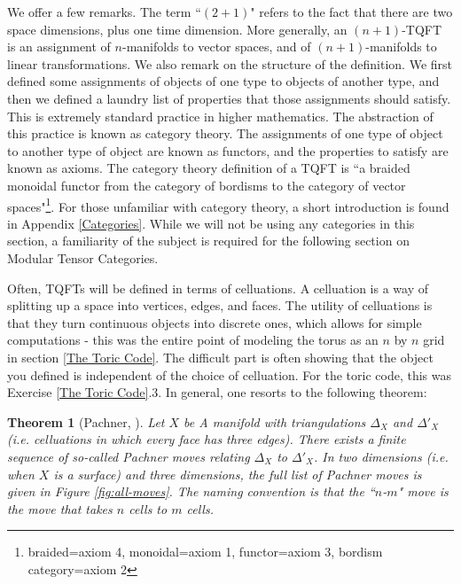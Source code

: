 \documentclass{article}
\newtheorem{theorem}{Theorem}[section]
\theoremstyle{definition}
\numberwithin{figure}{section}
\begin{document}
We offer a few remarks. The term ``$(2+1)$" refers to the fact that there are two space dimensions, plus one time dimension. More generally, an $(n+1)$-TQFT is an assignment of $n$-manifolds to vector spaces, and of $(n+1)$-manifolds to linear transformations. We also remark on the structure of the definition. We first defined some assignments of objects of one type to objects of another type, and then we defined a laundry list of properties that those assignments should satisfy. This is extremely standard practice in higher mathematics. The abstraction of this practice is known as category theory. The assignments of one type of object to another type of object are known as functors, and the properties to satisfy are known as axioms. The category theory definition of a TQFT is ``a braided monoidal functor from the category of bordisms to the category of vector spaces"\footnote{braided=axiom 4, monoidal=axiom 1, functor=axiom 3, bordism category=axiom 2}. For those unfamiliar with category theory, a short introduction is found in Appendix \ref{Categories}. While we will not be using any categories in this section, a familiarity of the subject is required for the following section on Modular Tensor Categories.

Often, TQFTs will be defined in terms of celluations. A celluation is a way of splitting up a space into vertices, edges, and faces. The utility of celluations is that they turn continuous objects into discrete ones, which allows for simple computations - this was the entire point of modeling the torus as an $n$ by $n$ grid in section \ref{The Toric Code}. The difficult part is often showing that the object you defined is independent of the choice of celluation. For the toric code, this was Exercise \ref{The Toric Code}.3. In general, one resorts to the following theorem:

\begin{theorem}[Pachner, \cite{pachner1991pl, lickorish1999simplicial}]\label{Pachner} Let $X$ be A manifold with triangulations $\Delta_X$ and $\Delta'_X$ (i.e. celluations in which every face has three edges). There exists a finite sequence of so-called Pachner moves relating $\Delta_X$ to $\Delta'_X$. In two dimensions (i.e. when $X$ is a surface) and three dimensions, the full list of Pachner moves is given in Figure \ref{fig:all-moves}. The naming convention is that the ``$n$-$m$" move is the move that takes $n$ cells to $m$ cells.
\end{theorem}
\end{document}
